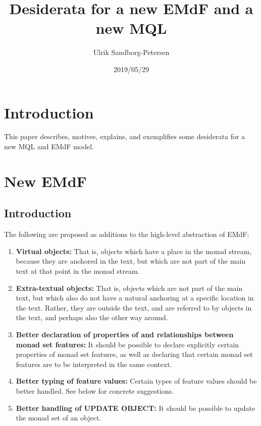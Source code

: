 \documentclass[a4paper,12pt]{article}
\begin{document}
\title{Desiderata for a new EMdF and a new MQL}
\author{Ulrik Sandborg-Petersen}
\date{2019/05/29}

\section{Introduction}

This paper describes, motives, explains, and exemplifies some
desiderata for a new MQL and EMdF model.

\section{New EMdF}

\subsection{Introduction}

The following are proposed as additions to the high-level abstraction
of EMdF:

\begin{enumerate}
\item \textbf{Virtual objects:} That is, objects which have a place in
  the monad stream, because they are anchored in the text, but which
  are not part of the main text at that point in the monad stream.
  
\item \textbf{Extra-textual objects:} That is, objects which are not
  part of the main text, but which also do not have a natural
  anchoring at a specific location in the text.  Rather, they are
  outside the text, and are referred to by objects in the text, and
  perhaps also the other way around.

\item \textbf{Better declaration of properties of and relationships
  between monad set features:} It should be possible to declare
  explicitly certain properties of monad set features, as well as
  declaring that certain monad set features are to be interpreted in
  the same context.

\item \textbf{Better typing of feature values:} Certain types of
  feature values should be better handled.  See below for concrete
  suggestions.

\item \textbf{Better handling of UPDATE OBJECT:} It should be possible
  to update the monad set of an object.
  
\end{enumerate}
\end{document}
